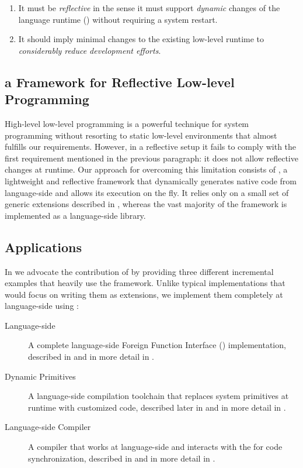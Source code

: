 \begin{enumerate}
	\item It must be \emph{reflective} in the sense it must support \emph{dynamic} changes of the language runtime (\VM) without requiring a system restart.
	\item It should imply minimal changes to the existing low-level runtime to \emph{considerably reduce development efforts}.
\end{enumerate}


\subsection{\B a Framework for Reflective Low-level Programming}

High-level low-level programming is a powerful technique for system programming without resorting to static low-level environments \cite{Fram09a,Wimm13a} that almost fulfills our requirements.
However, in a reflective setup it fails to comply with the first requirement mentioned in the previous paragraph: it does not allow reflective changes at runtime.
Our approach for overcoming this limitation consists of \B, a lightweight and reflective framework that dynamically generates native code from language-side and allows its execution on the fly.
It relies only on a small set of generic \VM extensions described in , whereas the vast majority of the framework is implemented as a language-side library.

\subsection{\B Applications}
In  we advocate the contribution of \B by providing three different incremental examples that heavily use the framework.
Unlike typical implementations that would focus on writing them as \VM extensions, we implement them completely at language-side using \B:

\begin{description}
	\item[Language-side \FFI] A complete language-side Foreign Function Interface (\FFI) implementation, described in  and in more detail in .
	\item[Dynamic Primitives] A language-side compilation toolchain that replaces system primitives at runtime with customized code, described later in  and in more detail in . 
	\item[Language-side \JIT Compiler] A \JIT compiler that works at language-side and interacts with the \VM for code synchronization, described in  and in more detail in .
\end{description}

